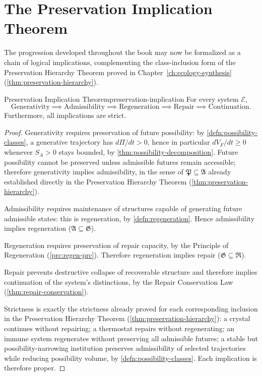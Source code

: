\documentclass[12pt,twoside,openright]{book}
\begin{document}
\section{The Preservation Implication Theorem}
\label{sec:ch31-implication}

The progression developed throughout the book may now be
formalized as a chain of logical implications, complementing
the class-inclusion form of the Preservation Hierarchy
Theorem proved in Chapter~\ref{ch:ecology-synthesis}
(\cref{thm:preservation-hierarchy}).

\begin{theorem}{Preservation Implication Theorem}{preservation-implication}
  For every system $\mathcal{E}$,
  \[
    \text{Generativity} \implies \text{Admissibility}
    \implies \text{Regeneration} \implies \text{Repair}
    \implies \text{Continuation}.
  \]
  Furthermore, all implications are strict.
\end{theorem}

\begin{proof}
  Generativity requires preservation of future possibility:
  by \cref{defn:possibility-classes}, a generative
  trajectory has $d\Pi/dt > 0$, hence in particular
  $dV_F/dt \ge 0$ whenever $S_A>0$ stays bounded, by
  \cref{thm:possibility-decomposition}. Future possibility
  cannot be preserved unless admissible futures remain
  accessible; therefore generativity implies admissibility,
  in the sense of $\mathfrak{P}\subseteq\mathfrak{A}$
  already established directly in the Preservation
  Hierarchy Theorem (\cref{thm:preservation-hierarchy}).

  Admissibility requires maintenance of structures capable
  of generating future admissible states: this is
  regeneration, by \cref{defn:regeneration}. Hence
  admissibility implies regeneration
  ($\mathfrak{A}\subseteq\mathfrak{G}$).

  Regeneration requires preservation of repair capacity, by
  the Principle of Regeneration (\cref{prc:regen-prc}).
  Therefore regeneration implies repair
  ($\mathfrak{G}\subseteq\mathfrak{R}$).

  Repair prevents destructive collapse of recoverable
  structure and therefore implies continuation of the
  system's distinctions, by the Repair Conservation Law
  (\cref{thm:repair-conservation}).

  Strictness is exactly the strictness already proved for
  each corresponding inclusion in the Preservation Hierarchy
  Theorem (\cref{thm:preservation-hierarchy}): a crystal
  continues without repairing; a thermostat repairs without
  regenerating; an immune system regenerates without
  preserving all admissible futures; a stable but
  possibility-narrowing institution preserves admissibility
  of selected trajectories while reducing possibility
  volume, by \cref{defn:possibility-classes}. Each
  implication is therefore proper.
\end{proof}
\end{document}
